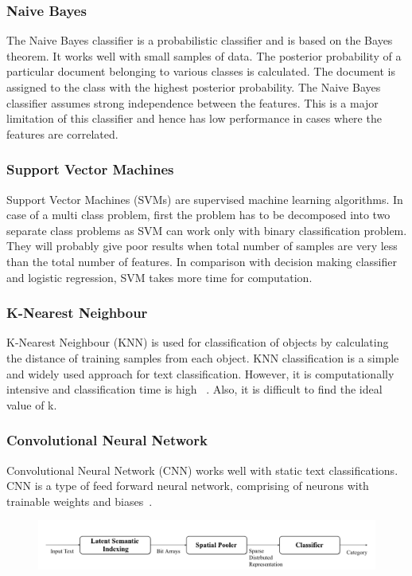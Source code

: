 \documentclass[12pt]{article}
\begin{document}
\begin{multicols}{2}
\subsubsection{Naive Bayes}
The Naive Bayes classifier is a probabilistic classifier and is
based on the Bayes theorem. It works well with small samples
of data. The posterior probability of a particular document
belonging to various classes is calculated. The document is
assigned to the class with the highest posterior probability. The
Naive Bayes classifier assumes strong independence between
the features. This is a major limitation of this classifier and
hence has low performance in cases where the features are
correlated.~\cite{1}
\subsubsection{Support Vector Machines}
Support Vector Machines (SVMs) are supervised machine
learning algorithms. In case of a multi class problem, first
the problem has to be decomposed into two separate class
problems as SVM can work only with binary classification
problem. They will probably give poor results when total
number of samples are very less than the total number of
features. In comparison with decision making classifier and
logistic regression, SVM takes more time for computation. ~\cite{1}
\subsubsection{K-Nearest Neighbour}
K-Nearest Neighbour (KNN) is used for classification of
objects by calculating the distance of training samples from
each object. KNN classification is a simple and widely used
approach for text classification. However, it is computationally
intensive and classification time is high ~\cite{1}. Also, it is difficult
to find the ideal value of k.~\cite{2}

\subsubsection{Convolutional Neural Network}
Convolutional Neural Network (CNN) works well with static text classifications. CNN is a type of feed forward neural network, comprising of neurons with trainable weights
and biases~\cite{3}.
\end{multicols}
\begin{figure}[h]
\includegraphics[scale=0.36]{image1.png}
\end{figure}
\end{document}

